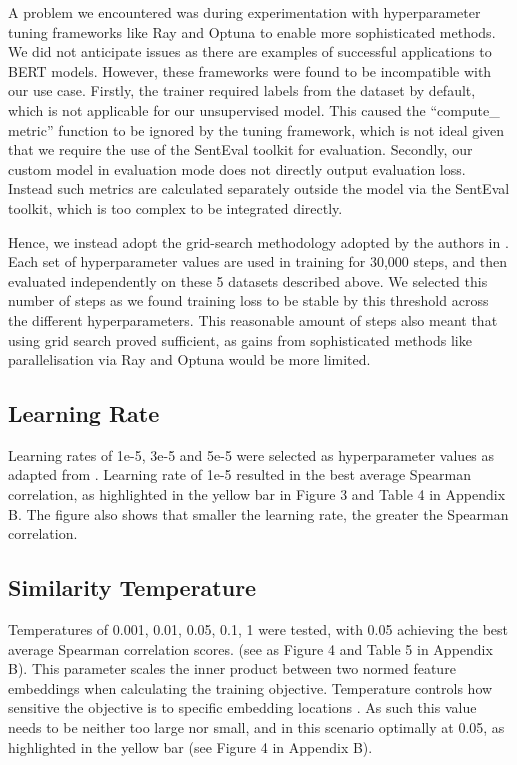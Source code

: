 \documentclass[10pt,twocolumn,letterpaper]{article}
\begin{document}
A problem we encountered was during experimentation with hyperparameter tuning frameworks like Ray and Optuna to enable more sophisticated methods. We did not anticipate issues as there are examples of successful applications to BERT models. However, these frameworks were found to be incompatible with our use case. Firstly, the trainer required labels from the dataset by default, which is not applicable for our unsupervised model. This caused the ``compute\_ metric'' function to be ignored by the tuning framework, which is not ideal given that we require the use of the SentEval toolkit for evaluation. Secondly, our custom model in evaluation mode does not directly output evaluation loss. Instead such metrics are calculated separately outside the model via the SentEval toolkit, which is too complex to be integrated directly.

Hence, we instead adopt the grid-search methodology adopted by the authors in \cite{2104.08821}. Each set of hyperparameter values are used in training for 30,000 steps, and then evaluated independently on these 5 datasets described above. We selected this number of steps as we found training loss to be stable by this threshold across the different hyperparameters. This reasonable amount of steps also meant that using grid search proved sufficient, as gains from sophisticated methods like parallelisation via Ray and Optuna would be more limited.


\subsection{Learning Rate}

Learning rates of 1e-5, 3e-5 and 5e-5 were selected as hyperparameter values as adapted from \cite{2104.08821}. Learning rate of 1e-5  resulted in the best average Spearman correlation, as highlighted in the yellow bar in Figure 3 and Table 4 in Appendix B. The figure also shows that smaller the learning rate, the greater the Spearman correlation.

\subsection{Similarity Temperature}

Temperatures of 0.001, 0.01, 0.05, 0.1, 1 were tested, with 0.05 achieving the best average Spearman correlation scores. (see as Figure 4 and Table 5 in Appendix B). This parameter scales the inner product between two normed feature embeddings\cite{2112.01642} when calculating the training objective. Temperature controls how sensitive the objective is to specific embedding locations \cite{2110.04403}. As such this value needs to be neither too large nor small, and in this scenario optimally at 0.05, as highlighted in the yellow bar (see Figure 4 in Appendix B).
\end{document}
